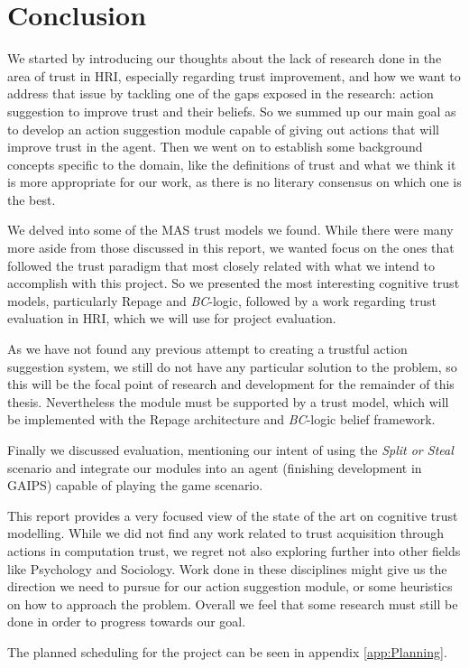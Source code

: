 \section{Conclusion}
\label{sec:Conclusion}
We started by introducing our thoughts about the lack of research done in the area of trust in \ac{HRI}, especially regarding trust improvement, and how we want to address that issue by tackling one of the gaps exposed in the research: action suggestion to improve trust and their beliefs. So we summed up our main goal as to develop an action suggestion module capable of giving out actions that will improve trust in the agent. Then we went on to establish some background concepts specific to the domain, like the definitions of trust and what we think it is more appropriate for our work, as there is no literary consensus on which one is the best. 

We delved into some of the \ac{MAS} trust models we found. While there were many more aside from those discussed in this report, we wanted focus on the ones that followed the trust paradigm that most closely related with what we intend to accomplish with this project. So we presented the most interesting cognitive trust models, particularly Repage and \textit{BC}-logic, followed by a work regarding trust evaluation in \ac{HRI}, which we will use for project evaluation.

As we have not found any previous attempt to creating a trustful action suggestion system, we still do not have any particular solution to the problem, so this will be the focal point of research and development for the remainder of this thesis. Nevertheless the module must be supported by a trust model, which will be implemented with the Repage architecture and \textit{BC}-logic belief framework.

Finally we discussed evaluation, mentioning our intent of using the \textit{Split or Steal} scenario and integrate our modules into an agent (finishing development in \ac{GAIPS}) capable of playing the game scenario.

This report provides a very focused view of the state of the art on cognitive trust modelling. While we did not find any work related to trust acquisition through actions in computation trust, we regret not also exploring further into other fields like Psychology and Sociology. Work done in these disciplines might give us the direction we need to pursue for our action suggestion module, or some heuristics on how to approach the problem. Overall we feel that some research must still be done in order to progress towards our goal.

The planned scheduling for the project can be seen in appendix \ref{app:Planning}.